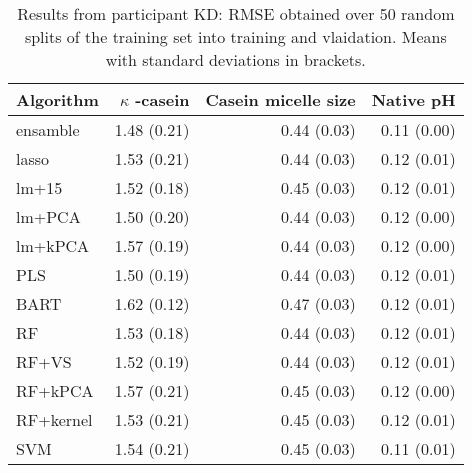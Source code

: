 \documentclass[a4paper,11pt]{article}
\begin{document}
\begin{table}[h!]
\centering
\begin{tabular}{lrrr}
  \hline

  Algorithm & $\kappa$ -casein & Casein micelle size & Native pH \\ 
  \hline
ensamble & 1.48 (0.21) & 0.44 (0.03) & 0.11 (0.00) \\ 
lasso & 1.53 (0.21) & 0.44 (0.03) & 0.12  (0.01) \\ 
lm+15 & 1.52 (0.18) & 0.45 (0.03) & 0.12  (0.01) \\ 
lm+PCA & 1.50 (0.20) & 0.44 (0.03) & 0.12  (0.00) \\ 
lm+kPCA & 1.57 (0.19) & 0.44 (0.03) & 0.12  (0.00) \\ 
PLS  & 1.50 (0.19) & 0.44 (0.03) & 0.12  (0.01) \\ 
BART & 1.62 (0.12) & 0.47 (0.03) & 0.12 (0.01) \\ 
RF & 1.53 (0.18) & 0.44 (0.03) & 0.12  (0.01) \\ 
RF+VS & 1.52 (0.19) & 0.44 (0.03) & 0.12  (0.01) \\ 
RF+kPCA & 1.57 (0.21) & 0.45 (0.03) & 0.12  (0.00) \\ 
RF+kernel & 1.53 (0.21) & 0.45 (0.03) & 0.12  (0.01) \\ 
SVM & 1.54 (0.21) & 0.45 (0.03) & 0.11  (0.01) \\ 
   \hline
\end{tabular}
\caption{Results from participant KD: RMSE obtained over 50 random splits of the training set into training and vlaidation. Means with standard deviations in brackets.}
\label{table:KD}
\end{table}



% 

\end{document}
